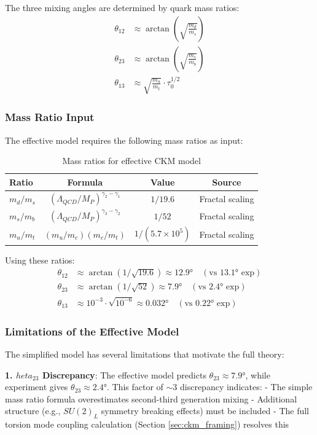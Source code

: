 The three mixing angles are determined by quark mass ratios:
\begin{align}
    \theta_{12} &\approx \arctan\left(\sqrt{\frac{m_d}{m_s}}\right) \\
    \theta_{23} &\approx \arctan\left(\sqrt{\frac{m_s}{m_b}}\right) \\
    \theta_{13} &\approx \sqrt{\frac{m_u}{m_t}} \cdot \tau_0^{1/2}
\end{align}

\subsubsection{Mass Ratio Input}

The effective model requires the following mass ratios as input:

\begin{table}[h]
\centering
\begin{tabular}{lccc}
\hline
\textbf{Ratio} & \textbf{Formula} & \textbf{Value} & \textbf{Source} \\
\hline
$m_d/m_s$ & $(\Lambda_{QCD}/M_P)^{\gamma_2-\gamma_1}$ & $1/19.6$ & Fractal scaling \\
$m_s/m_b$ & $(\Lambda_{QCD}/M_P)^{\gamma_3-\gamma_2}$ & $1/52$ & Fractal scaling \\
$m_u/m_t$ & $(m_u/m_c)(m_c/m_t)$ & $1/(5.7\times 10^5)$ & Fractal scaling \\
\hline
\end{tabular}
\caption{Mass ratios for effective CKM model}
\end{table}

Using these ratios:
\begin{align}
    \theta_{12} &\approx \arctan(1/\sqrt{19.6}) \approx 12.9° \quad (\text{vs } 13.1° \text{ exp}) \\
    \theta_{23} &\approx \arctan(1/\sqrt{52}) \approx 7.9° \quad (\text{vs } 2.4° \text{ exp}) \\
    \theta_{13} &\approx 10^{-3} \cdot \sqrt{10^{-6}} \approx 0.032° \quad (\text{vs } 0.22° \text{ exp})
\end{align}

\subsubsection{Limitations of the Effective Model}

The simplified model has several limitations that motivate the full theory:

\textbf{1. $	heta_{23}$ Discrepancy}: The effective model predicts $\theta_{23} \approx 7.9°$, while experiment gives $\theta_{23} \approx 2.4°$. This factor of $\sim 3$ discrepancy indicates:
- The simple mass ratio formula overestimates second-third generation mixing
- Additional structure (e.g., $SU(2)_L$ symmetry breaking effects) must be included
- The full torsion mode coupling calculation (Section \ref{sec:ckm_framing}) resolves this

